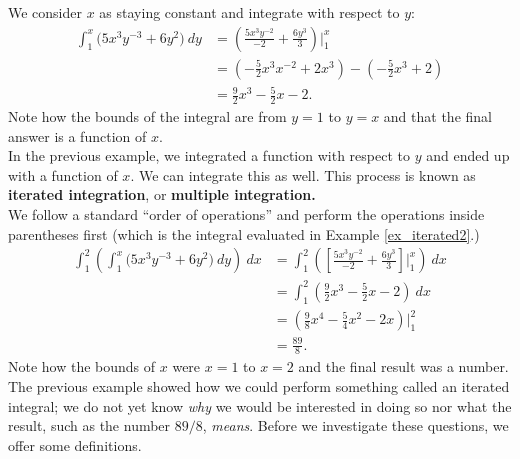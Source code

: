 {We consider $x$ as staying constant and integrate with respect to $y$:
\begin{align*}
\int_1^x\big(5x^3y^{-3}+6y^2\big)\ dy & = \left(\frac{5x^3y^{-2}}{-2}+\frac{6y^3}{3}\right)\Bigg|_1^x \\
						&= \left(-\frac52x^3x^{-2}+2x^3\right) - \left(-\frac52x^3+2\right) \\
						&= \frac92x^3-\frac52x-2.
\end{align*}
Note how the bounds of the integral are from $y=1$ to $y=x$ and that the final answer is a function of $x$.
}\\

In the previous example, we integrated a function with respect to $y$ and ended up with a function of $x$. We can integrate this as well. This process is known as \textbf{iterated integration}, or \textbf{multiple integration.}\\

{We follow a standard ``order of operations'' and perform the operations inside parentheses first (which is the integral evaluated in Example \ref{ex_iterated2}.)
\begin{align*}
\int_1^2\left(\int_1^x\big(5x^3y^{-3}+6y^2\big)\ dy\right)\ dx &= \int_1^2 \left(\left[\frac{5x^3y^{-2}}{-2}+\frac{6y^3}{3}\right]\Bigg|_1^x\right)\ dx \\
			&= \int_1^2 \left(\frac92x^3-\frac52x-2\right)\ dx \\
			&= \left(\frac98x^4-\frac54x^2-2x\right)\Bigg|_1^2\\
			&= \frac{89}8.
\end{align*}
Note how the bounds of $x$ were $x=1$ to $x=2$ and the final result was a number.
}\\

The previous example showed how we could perform something called an iterated integral; we do not yet know \textit{why} we would be interested in doing so nor what the result, such as the number $89/8$, \textit{means}. Before we investigate these questions, we offer some definitions.

